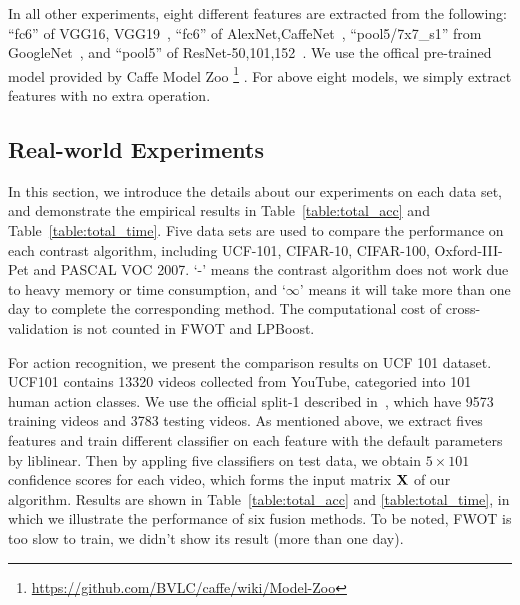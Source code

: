 \documentclass[letterpaper]{article}
\def\bX{{\bf X}}
\def\bX{{\bf X}}
\begin{document}
In all other experiments, eight different features are extracted from the following:
``fc6'' of VGG16, VGG19~\cite{chatfield2014return},
``fc6'' of AlexNet,CaffeNet~\cite{krizhevsky2012imagenet},
``pool5/7x7\_s1'' from GoogleNet~\cite{szegedy2015going},
and ``pool5'' of ResNet-50,101,152~\cite{he2015deep}.
We use the offical pre-trained model provided by Caffe Model Zoo
\footnote{\url{https://github.com/BVLC/caffe/wiki/Model-Zoo}}
.
For above eight models, we simply extract features with no extra operation.





\subsection{Real-world Experiments}

In this section, we introduce the details about our experiments on each data set,
and demonstrate the empirical results in Table~\ref{table:total_acc} and Table~\ref{table:total_time}.
Five data sets are used to compare the performance on each contrast algorithm, including UCF-101, CIFAR-10, CIFAR-100, Oxford-III-Pet and PASCAL VOC 2007.
`-' means the contrast algorithm does not work due to heavy memory or time consumption,
and `$\infty$' means it will take more than one day to complete the corresponding method.
The computational cost of cross-validation is not counted in FWOT and LPBoost.

For action recognition, we present the comparison results on UCF 101 dataset.
UCF101 contains 13320 videos collected from YouTube, categoried into 101 human action classes.
We use the official split-1 described in~\cite{soomro2012ucf101}, which have 9573 training videos and 3783 testing videos.
As mentioned above, we extract fives features and train different classifier on each feature with the default parameters by liblinear.
Then by appling five classifiers on test data, we obtain $5 \times 101$ confidence scores for each video, which forms the input matrix $\bX$ of our algorithm.
Results are shown in Table~\ref{table:total_acc} and \ref{table:total_time}, in which we illustrate the performance of six fusion methods.
To be noted, FWOT is too slow to train, we didn't show its result (more than one day).
\end{document}
